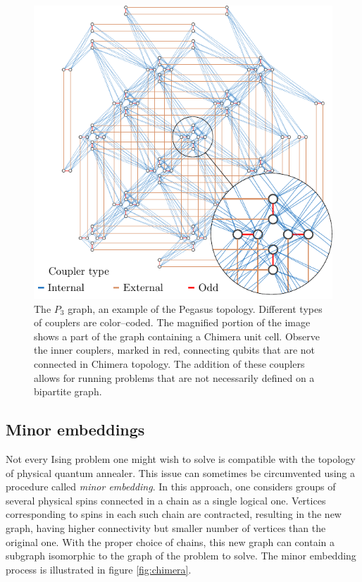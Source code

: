 \begin{figure}
    \includegraphics[width=\textwidth]{figures/pegasus}
    \caption{
        The $P_3$ graph, an example of the Pegasus topology. Different types of couplers are
        color--coded. The magnified portion of the image shows a part of the graph containing a
        Chimera unit cell. Observe the inner couplers, marked in red, connecting qubits that are not
        connected in Chimera topology. The addition of these couplers allows for running problems
        that are not necessarily defined on a bipartite graph.
    }
\end{figure}
\subsection{Minor embeddings}

Not every Ising problem one might wish to solve is compatible with the topology of physical quantum annealer. This issue can sometimes be circumvented using a procedure called \emph{minor embedding}. In this approach, one considers groups of several physical spins connected in a chain as a single logical one. Vertices corresponding to spins in each such chain are contracted, resulting in the new graph, having higher connectivity but smaller number of vertices than the original one. With the proper choice of chains, this new graph can contain a subgraph isomorphic to the graph of the problem to solve. The minor embedding process is illustrated in figure \ref{fig:chimera}.

